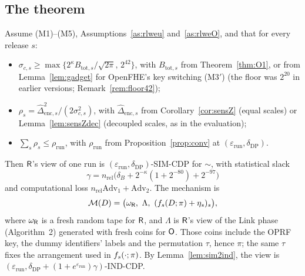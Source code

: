 \subsection{The theorem}

\begin{theorem}\label{thm:output}
Assume (M1)--(M5), Assumptions~\ref{as:rlweu} and~\ref{as:rlweO}, and that for every release $s$:
\begin{itemize}[nosep]
  \item $\sigma_{c,s}\ge\max\{2^{\kappa}B_{\mathrm{tot},s}/\sqrt{2\pi},\,2^{42}\}$, with $B_{\mathrm{tot},s}$ from Theorem~\ref{thm:O1}, or from Lemma~\ref{lem:gadget} for OpenFHE's key switching (M3$'$) (the floor was $2^{20}$ in earlier versions; Remark~\ref{rem:floor42});
  \item $\rho_s=\widehat\Delta_{\mathrm{enc},s}^2/(2\sigma_{c,s}^2)$, with $\widehat\Delta_{\mathrm{enc},s}$ from Corollary~\ref{cor:sensZ} (equal scales) or Lemma~\ref{lem:sensZdec} (decoupled scales, as in the evaluation);
  \item $\sum_s\rho_s\le\rho_{\mathrm{run}}$, with $\rho_{\mathrm{run}}$ from Proposition~\ref{prop:conv} at $(\varepsilon_{\mathrm{run}},\delta_{\mathrm{DP}})$.
\end{itemize}
Then $\mathsf{R}$'s view of one run is $(\varepsilon_{\mathrm{run}},\delta_{\mathrm{DP}})$-SIM-CDP for $\sim$, with statistical slack
\[
  \gamma=n_{\mathrm{rel}}\bigl(\delta_B+2^{-\kappa}(1+2^{-80})+2^{-97}\bigr)
\]
and computational loss $n_{\mathrm{rel}}\mathrm{Adv}_1+\mathrm{Adv}_2$. The mechanism is
\[
  \mathcal M(D)=\bigl(\omega_{\Rp},\ \Lambda,\ (\fs_s(D;\pi)+\eta_s)_s\bigr),
\]
where $\omega_{\mathsf{R}}$ is a fresh random tape for $\mathsf{R}$, and $\Lambda$ is $\mathsf{R}$'s view of the Link phase (Algorithm~2) generated with fresh coins for $\mathsf{O}$. Those coins include the OPRF key, the dummy identifiers' labels and the permutation $\tau$, hence $\pi$; the same $\tau$ fixes the arrangement used in $f_s(\cdot;\pi)$. By Lemma~\ref{lem:sim2ind}, the view is $(\varepsilon_{\mathrm{run}},\delta_{\mathrm{DP}}+(1+e^{\varepsilon_{\mathrm{run}}})\gamma)$-IND-CDP.
\end{theorem}

